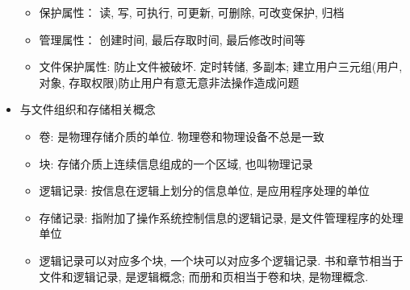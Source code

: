 \documentclass[a4paper, UTF8]{article}
\begin{document}
\begin{itemize}
\begin{itemize}
	\item 保护属性： 读, 写, 可执行, 可更新, 可删除, 可改变保护, 归档
	\item 管理属性： 创建时间, 最后存取时间, 最后修改时间等
	\item 文件保护属性: 防止文件被破坏. 定时转储, 多副本; 建立用户三元组(用户, 对象, 存取权限)防止用户有意无意非法操作造成问题
	\end{itemize}
\item 与文件组织和存储相关概念
	\begin{itemize}
	\item 卷: 是物理存储介质的单位. 物理卷和物理设备不总是一致
	\item 块: 存储介质上连续信息组成的一个区域, 也叫物理记录
	\item 逻辑记录: 按信息在逻辑上划分的信息单位, 是应用程序处理的单位
	\item 存储记录: 指附加了操作系统控制信息的逻辑记录, 是文件管理程序的处理单位
	\item 逻辑记录可以对应多个块, 一个块可以对应多个逻辑记录. 书和章节相当于文件和逻辑记录, 是逻辑概念; 而册和页相当于卷和块, 是物理概念.
	\end{itemize}
\end{itemize}
\end{document}

